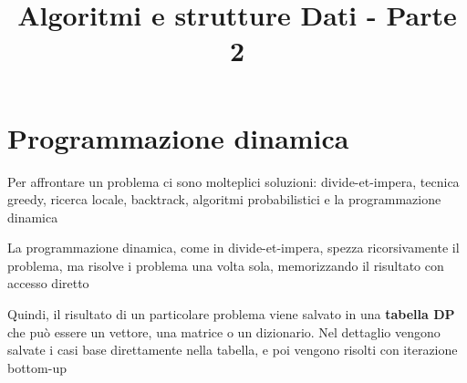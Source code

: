 \documentclass[12pt, a4paper]{article}
\title{Algoritmi e strutture Dati - Parte 2}
\begin{document}
    

\section{Programmazione dinamica}
Per affrontare un problema ci sono molteplici soluzioni: divide-et-impera, tecnica greedy, ricerca locale, 
backtrack, algoritmi probabilistici e la programmazione dinamica

La programmazione dinamica, come in divide-et-impera, spezza ricorsivamente il problema, ma risolve i problema una
volta sola, memorizzando il risultato con accesso diretto


Quindi, il risultato di un particolare problema viene salvato in una \textbf{tabella DP} che può essere un vettore,
una matrice o un dizionario. Nel dettaglio vengono salvate i casi base direttamente nella tabella, e poi 
vengono risolti con iterazione bottom-up
\end{document}
